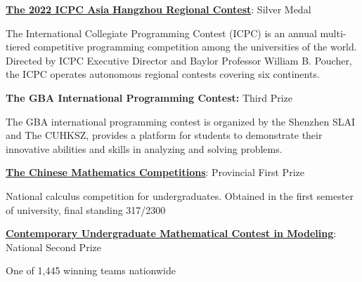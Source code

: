 \documentclass[letterpaper,MMMyyyy,nonstopmode]{simpleresumecv}
\begin{document}
\begin{Body}
\Gap
\BulletItem
\href{https://icpc.global/regionals/finder/ICPC-Hangzhou-2023}{\textbf{The 2022 ICPC Asia Hangzhou Regional Contest}}: Silver Medal
\hfill
{}
\begin{Detail}
\Item
The International Collegiate Programming Contest (ICPC) is an annual multi-tiered competitive programming competition among the universities of the world. Directed by ICPC Executive Director and Baylor Professor William B. Poucher, the ICPC operates autonomous regional contests covering six continents.
\end{Detail}


\Gap
\BulletItem
\textbf{The GBA International Programming Contest: }Third Prize
\hfill
{}
\begin{Detail}
\Item
The GBA international programming contest is organized by the Shenzhen SLAI and The CUHKSZ, provides a
platform for students to demonstrate their
innovative abilities and skills in analyzing and solving problems.
\end{Detail}

\Gap
\BulletItem
\href{http://www.cmathc.cn/}{\textbf{The Chinese Mathematics Competitions}}: Provincial First Prize
\hfill
{}
\begin{Detail}
\Item
National calculus competition for undergraduates. Obtained in the first semester of university, final standing 317/2300
\end{Detail}

\Gap
\BulletItem
\href{https://www.mcm.edu.cn/html_cn/node/5b6ed02462b2ea3d79206e445af3433a.html}{\textbf{Contemporary Undergraduate Mathematical Contest in Modeling}}: National Second Prize
\hfill
{}
\begin{Detail}
\Item
One of 1,445 winning teams nationwide
\end{Detail}


\end{Body}
\end{document}
